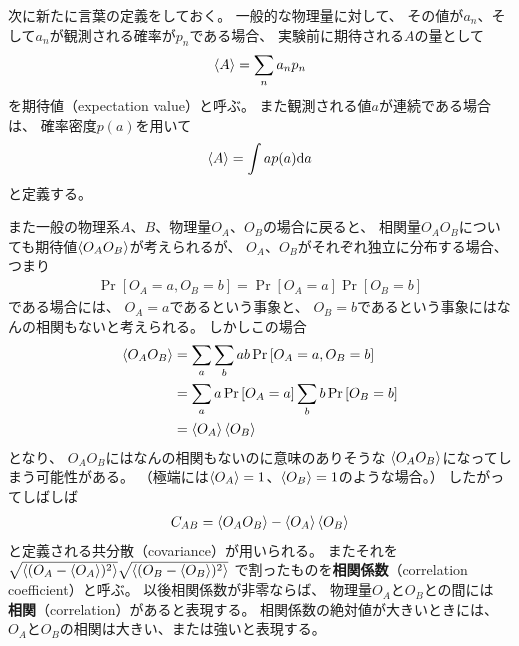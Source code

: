 \documentclass[a4paper, 10pt]{jsarticle}
\begin{document}
次に新たに言葉の定義をしておく。
一般的な物理量に対して、
その値が$a_n$、そして$a_n$が観測される確率が$p_n$である場合、
実験前に期待される$A$の量として
\begin{align}
	\Braket{A} = \sum_n a_n p_n
\end{align}
を期待値（expectation value）と呼ぶ。
また観測される値$a$が連続である場合は、
確率密度$p(a)$を用いて
\begin{align}
	\Braket{A} = \int a p(a) {\rm d} a
\end{align}
と定義する。

また一般の物理系$A$、$B$、物理量$O_A$、$O_B$の場合に戻ると、
相関量$O_A O_B$についても期待値$\Braket{O_A O_B}$が考えられるが、
$O_A$、$O_B$がそれぞれ独立に分布する場合、
つまり
\begin{align}
	\Pr \left[ O_A = a, O_B = b \right]
	= \Pr \left[ O_A = a \right] \Pr \left[ O_B = b \right]
\end{align}
である場合には、
$O_A = a$であるという事象と、
$O_B = b$であるという事象にはなんの相関もないと考えられる。
しかしこの場合
\begin{align}
	\Braket{O_A O_B} 
	&= \sum_a \sum_b a b \Pr \left[ O_A = a, O_B = b \right] \\
	&= \sum_a a \Pr \left[ O_A = a \right]
	\sum_b b \Pr \left[ O_B = b \right] \\
	&= \Braket{O_A} \Braket{O_B}
\end{align}
となり、
$O_A O_B$にはなんの相関もないのに意味のありそうな
$\Braket{O_A O_B}$になってしまう可能性がある。
（極端には$\Braket{O_A} = 1$、$\Braket{O_B} = 1$のような場合。）
したがってしばしば
\begin{align}
	C_{AB} = \Braket{O_A O_B} - \Braket{O_A} \Braket{O_B}
\end{align}
と定義される共分散（covariance）が用いられる。
またそれを
$\sqrt{\Braket{( O_A - \Braket{O_A})^2}}
\sqrt{\Braket{( O_B - \Braket{O_B})^2}}$
で割ったものを\textbf{相関係数}（correlation coefficient）と呼ぶ。
以後相関係数が非零ならば、
物理量$O_A$と$O_B$との間には
\textbf{相関}（correlation）があると表現する。
相関係数の絶対値が大きいときには、
$O_A$と$O_B$の相関は大きい、または強いと表現する。
\end{document}
